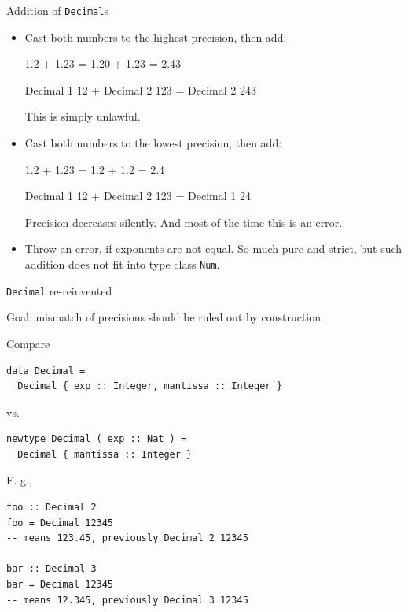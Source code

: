 \documentclass[handout]{beamer}
\begin{document}
\begin{frame}[fragile]{Addition of {\tt Decimal}s}

\begin{itemize}

\item Cast both numbers to the highest precision, then add:

    1.2 + 1.23 = 1.20 + 1.23 = 2.43

    Decimal 1 12 + Decimal 2 123 = Decimal 2 243

    This is simply unlawful.

\item Cast both numbers to the lowest precision, then add:

    1.2 + 1.23 = 1.2 + 1.2 = 2.4

    Decimal 1 12 + Decimal 2 123 = Decimal 1 24

    Precision decreases silently. And most of the time this is an error.

\item Throw an error, if exponents are not equal.
    So much pure and strict, but such addition does not fit into type class {\tt Num}.

\end{itemize}

\end{frame}

\begin{frame}[fragile]{{\tt Decimal} re-reinvented}

Goal: mismatch of precisions should be ruled out by construction.

Compare
\begin{lstlisting}
data Decimal =
  Decimal { exp :: Integer, mantissa :: Integer }
\end{lstlisting}
vs.
\begin{lstlisting}
newtype Decimal ( exp :: Nat ) =
  Decimal { mantissa :: Integer }
\end{lstlisting}

E. g.,
\begin{lstlisting}
foo :: Decimal 2
foo = Decimal 12345
-- means 123.45, previously Decimal 2 12345

bar :: Decimal 3
bar = Decimal 12345
-- means 12.345, previously Decimal 3 12345
\end{lstlisting}

\end{frame}
\end{document}

